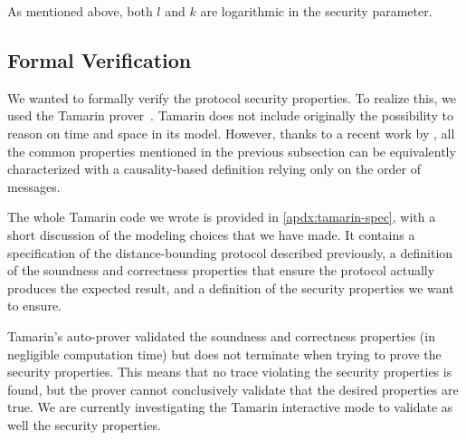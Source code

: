 As mentioned above, both \(l\) and \(k\) are logarithmic in the security 
parameter.

\subsection{Formal Verification}

We wanted to formally verify the protocol security properties. To realize this, 
we used the Tamarin prover~\cite{meier2013tamarin}. Tamarin does not include 
originally the possibility to reason on time and space in its model.
However, thanks to a recent work by \textcite{TamarinDB}, all the common 
properties mentioned in the previous subsection can be equivalently 
characterized with a causality-based definition relying only on the order of 
messages.

The whole Tamarin code we wrote is provided in \cref{apdx:tamarin-spec}, with a short discussion of the modeling choices that we have made. 
It contains a specification of the distance-bounding protocol described previously, a definition of the soundness and correctness properties that ensure the protocol actually produces the expected result, and a definition of the security properties we want to ensure.

Tamarin's auto-prover validated the soundness and correctness properties (in negligible computation time) but does not terminate when trying to prove the security properties.
This means that no trace violating the security properties is found, but the prover cannot conclusively validate that the desired properties are true. 
We are currently investigating the Tamarin interactive mode to validate as well the security properties.


